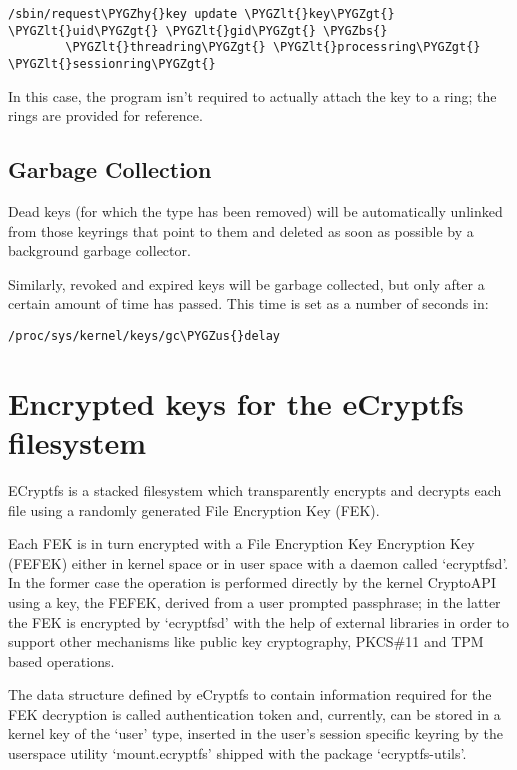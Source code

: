 \documentclass[a4paper,8pt,english]{sphinxmanual}
\def\PYGZbs{\char`\\}
\def\PYGZus{\char`\_}
\def\PYGZlt{\char`\<}
\def\PYGZgt{\char`\>}
\def\PYGZhy{\char`\-}
\begin{document}
\begin{Verbatim}[commandchars=\\\{\}]
/sbin/request\PYGZhy{}key update \PYGZlt{}key\PYGZgt{} \PYGZlt{}uid\PYGZgt{} \PYGZlt{}gid\PYGZgt{} \PYGZbs{}
        \PYGZlt{}threadring\PYGZgt{} \PYGZlt{}processring\PYGZgt{} \PYGZlt{}sessionring\PYGZgt{}
\end{Verbatim}

In this case, the program isn't required to actually attach the key to a ring;
the rings are provided for reference.


\subsection{Garbage Collection}
\label{security/keys/core:garbage-collection}
Dead keys (for which the type has been removed) will be automatically unlinked
from those keyrings that point to them and deleted as soon as possible by a
background garbage collector.

Similarly, revoked and expired keys will be garbage collected, but only after a
certain amount of time has passed.  This time is set as a number of seconds in:

\begin{Verbatim}[commandchars=\\\{\}]
/proc/sys/kernel/keys/gc\PYGZus{}delay
\end{Verbatim}


\section{Encrypted keys for the eCryptfs filesystem}
\label{security/keys/ecryptfs:encrypted-keys-for-the-ecryptfs-filesystem}\label{security/keys/ecryptfs::doc}
ECryptfs is a stacked filesystem which transparently encrypts and decrypts each
file using a randomly generated File Encryption Key (FEK).

Each FEK is in turn encrypted with a File Encryption Key Encryption Key (FEFEK)
either in kernel space or in user space with a daemon called `ecryptfsd'.  In
the former case the operation is performed directly by the kernel CryptoAPI
using a key, the FEFEK, derived from a user prompted passphrase;  in the latter
the FEK is encrypted by `ecryptfsd' with the help of external libraries in order
to support other mechanisms like public key cryptography, PKCS\#11 and TPM based
operations.

The data structure defined by eCryptfs to contain information required for the
FEK decryption is called authentication token and, currently, can be stored in a
kernel key of the `user' type, inserted in the user's session specific keyring
by the userspace utility `mount.ecryptfs' shipped with the package
`ecryptfs-utils'.
\end{document}
